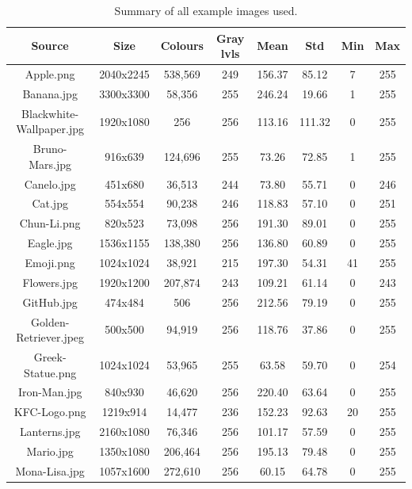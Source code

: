 \documentclass[10pt,a4paper]{article}
\begin{document}
\begin{table}[htbp]
  \centering
  \caption{Summary of all example images used.}
  \label{tab:images}
  \begin{tabular}{|c|c|c|c|c|c|c|c|}
    \hline 
    Source & Size & Colours & Gray lvls &Mean & Std & Min & Max \\
    \hline
    Apple.png                & 2040x2245  & 538,569 & 249 & 156.37 & 85.12 & 7 & 255 \\
    Banana.jpg               & 3300x3300  & 58,356  & 255 & 246.24 & 19.66 & 1 & 255 \\
    Blackwhite-Wallpaper.jpg & 1920x1080  & 256     & 256 & 113.16 & 111.32 & 0 & 255 \\
    Bruno-Mars.jpg           & 916x639    & 124,696 & 255 & 73.26  & 72.85  & 1 & 255 \\
    Canelo.jpg               & 451x680    & 36,513  & 244 & 73.80  & 55.71  & 0 & 246 \\
    Cat.jpg                  & 554x554    & 90,238  & 246 & 118.83 & 57.10  & 0 & 251 \\
    Chun-Li.png              & 820x523    & 73,098  & 256 & 191.30 & 89.01  & 0 & 255 \\
    Eagle.jpg                & 1536x1155  & 138,380 & 256 & 136.80 & 60.89  & 0 & 255 \\
    Emoji.png                & 1024x1024  & 38,921  & 215 & 197.30 & 54.31  & 41 & 255 \\
    Flowers.jpg              & 1920x1200  & 207,874 & 243 & 109.21 & 61.14  & 0 & 243 \\
    GitHub.jpg               & 474x484    & 506     & 256 & 212.56 & 79.19  & 0 & 255 \\
    Golden-Retriever.jpeg    & 500x500    & 94,919  & 256 & 118.76 & 37.86  & 0 & 255 \\
    Greek-Statue.png         & 1024x1024  & 53,965  & 255 & 63.58  & 59.70  & 0 & 254 \\
    Iron-Man.jpg             & 840x930    & 46,620  & 256 & 220.40 & 63.64  & 0 & 255 \\
    KFC-Logo.png             & 1219x914   & 14,477  & 236 & 152.23 & 92.63  & 20 & 255 \\
    Lanterns.jpg             & 2160x1080  & 76,346  & 256 & 101.17 & 57.59  & 0 & 255 \\
    Mario.jpg                & 1350x1080  & 206,464 & 256 & 195.13 & 79.48  & 0 & 255 \\
    Mona-Lisa.jpg            & 1057x1600  & 272,610 & 256 & 60.15  & 64.78  & 0 & 255 \\

\end{tabular}
\end{table}
\end{document}
